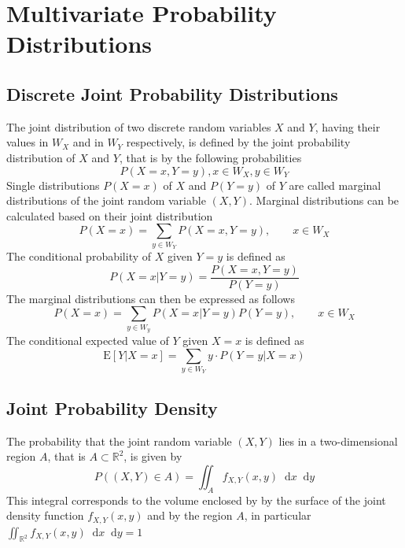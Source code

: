 \documentclass[11pt]{article}
\theoremstyle{definition}
\newcommand*\ev[1]{\mathrel{\text{E}\left[#1\right]}}
\newcommand*\R{\mathbb{R}}
\newcommand*\diff{\mathop{}\!\mathrm{d}}
\begin{document}
\section{Multivariate Probability Distributions}

\subsection{Discrete Joint Probability Distributions}
The joint distribution of two discrete random variables $X$ and $Y$, having their values in $W_X$ and in $W_Y$ respectively, is defined by the joint probability distribution of $X$ and $Y$, that is by the following probabilities
\begin{equation*}
	P(X=x, Y=y), x\in W_X, y\in W_Y
\end{equation*}
Single distributions $P(X = x)$ of $X$ and $P(Y = y)$ of $Y$ are called marginal distributions of the joint random variable $(X,Y)$. Marginal distributions can be calculated based on their joint distribution
\begin{equation*}
	P(X=x) = \sum_{y\in W_Y} P(X = x, Y = y),\qquad x\in W_X
\end{equation*}
The conditional probability of $X$ given $Y=y$ is defined as
\begin{equation*}
	P(X = x | Y = y) = \frac{P(X = x, Y = y)}{P(Y=y)}
\end{equation*}
The marginal distributions can then be expressed as follows
\begin{equation*}
	P(X=x) = \sum_{y\in W_y} P(X=x|Y=y)P(Y=y),\qquad x\in W_X
\end{equation*}
The conditional expected value of $Y$ given $X=x$ is defined as
\begin{equation*}
	\ev{Y|X=x} = \sum_{y\in W_Y} y\cdot P(Y=y|X=x)
\end{equation*}

\subsection{Joint Probability Density}
The probability that the joint random variable $(X,Y)$ lies in a two-dimensional region $A$, that is $A\subset \R^2$, is given by
\begin{equation*}
	P\left( (X,Y) \in A \right) = \iint_{A} f_{X,Y}(x,y) \diff x \diff y
\end{equation*}
This integral corresponds to the volume enclosed by by the surface of the joint density function $f_{X,Y}(x,y)$ and by the region $A$, in particular $\iint_{\R^2} f_{X,Y}(x,y) \diff x\diff y = 1$
\end{document}
